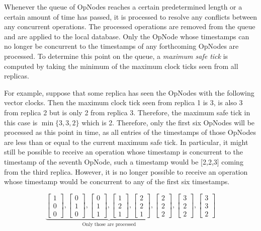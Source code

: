 \documentclass[sigconf,nonacm,10pt]{acmart}
\begin{document}
Whenever the queue of OpNodes reaches a certain predetermined length or a certain amount of time has passed, it is processed to resolve any conflicts between any concurrent operations. The processed operations are removed from the queue and are applied to the local database. Only the OpNode whose timestamps can no longer be concurrent to the timestamps of any forthcoming OpNodes are processed. To determine this point on the queue, a \emph{maximum safe tick} is computed by taking the minimum of the maximum clock ticks seen from all replicas. 

For example, suppose that some replica has seen the OpNodes with the following vector clocks. Then the maximum clock tick seen from replica 1 is 3, is also 3 from replica 2 but is only 2 from replica 3. Therefore, the maximum safe tick in this case is $\min\{3,3,2\}$ which is 2. Therefore, only the first six OpNodes will be processed as this point in time, as all entries of the timestamps of those OpNodes are less than or equal to the current maximum safe tick. In particular, it might still be possible to receive an operation whose timestamp is concurrent to the timestamp of the seventh OpNode, such a timestamp would be [2,2,3] coming from the third replica. However, it is no longer possible to receive an operation whose timestamp would be concurrent to any of the first six timestamps.

$$ \underbrace{\begin{bmatrix} 1\\0\\0 \end{bmatrix},
\begin{bmatrix} 0\\1\\0 \end{bmatrix},
\begin{bmatrix} 0\\1\\1 \end{bmatrix},
\begin{bmatrix} 1\\2\\1 \end{bmatrix},
\begin{bmatrix} 2\\2\\1 \end{bmatrix},
\begin{bmatrix} 2\\2\\2 \end{bmatrix}}_{\text{Only those are processed}},
\begin{bmatrix} 3\\2\\2 \end{bmatrix},
\begin{bmatrix} 3\\3\\2 \end{bmatrix}$$
\end{document}
